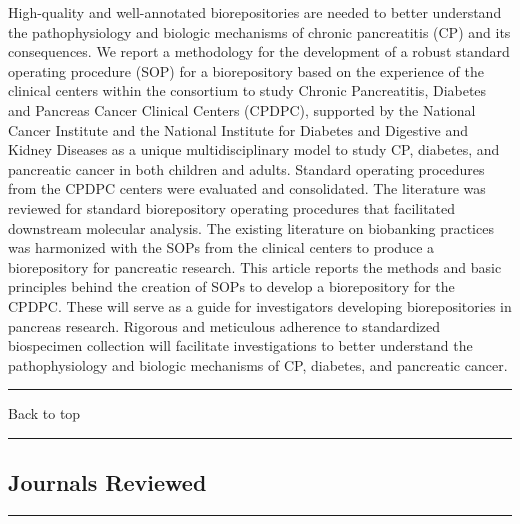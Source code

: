 \documentclass[]{article}
\begin{document}
High-quality and well-annotated biorepositories are needed to better
understand the pathophysiology and biologic mechanisms of chronic
pancreatitis (CP) and its consequences. We report a methodology for the
development of a robust standard operating procedure (SOP) for a
biorepository based on the experience of the clinical centers within the
consortium to study Chronic Pancreatitis, Diabetes and Pancreas Cancer
Clinical Centers (CPDPC), supported by the National Cancer Institute and
the National Institute for Diabetes and Digestive and Kidney Diseases as
a unique multidisciplinary model to study CP, diabetes, and pancreatic
cancer in both children and adults. Standard operating procedures from
the CPDPC centers were evaluated and consolidated. The literature was
reviewed for standard biorepository operating procedures that
facilitated downstream molecular analysis. The existing literature on
biobanking practices was harmonized with the SOPs from the clinical
centers to produce a biorepository for pancreatic research. This article
reports the methods and basic principles behind the creation of SOPs to
develop a biorepository for the CPDPC. These will serve as a guide for
investigators developing biorepositories in pancreas research. Rigorous
and meticulous adherence to standardized biospecimen collection will
facilitate investigations to better understand the pathophysiology and
biologic mechanisms of CP, diabetes, and pancreatic cancer.

{}

{}

\begin{center}\rule{0.5\linewidth}{\linethickness}\end{center}

Back to top

\begin{center}\rule{0.5\linewidth}{\linethickness}\end{center}

\pagebreak

\hypertarget{journals-reviewed}{%
\subsection{Journals Reviewed}\label{journals-reviewed}}

\begin{center}\rule{0.5\linewidth}{\linethickness}\end{center}
\end{document}
